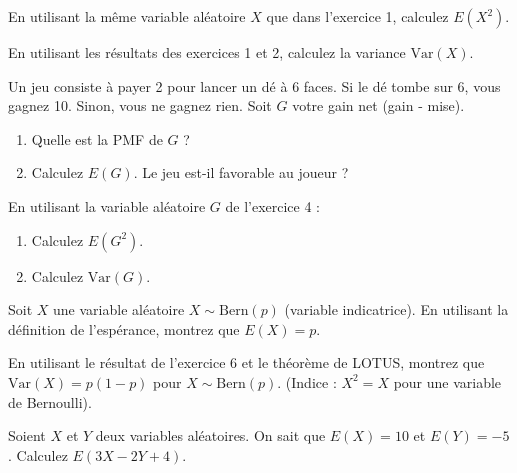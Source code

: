 \begin{exercicebox}
En utilisant la même variable aléatoire $X$ que dans l'exercice 1, calculez $E(X^2)$.
\end{exercicebox}

\begin{exercicebox}
En utilisant les résultats des exercices 1 et 2, calculez la variance $\text{Var}(X)$.
\end{exercicebox}

\begin{exercicebox}
Un jeu consiste à payer 2 pour lancer un dé à 6 faces. Si le dé tombe sur 6, vous gagnez 10. Sinon, vous ne gagnez rien. Soit $G$ votre gain net (gain - mise).
\begin{enumerate}
    \item Quelle est la PMF de $G$ ?
    \item Calculez $E(G)$. Le jeu est-il favorable au joueur ?
\end{enumerate}
\end{exercicebox}

\begin{exercicebox}
En utilisant la variable aléatoire $G$ de l'exercice 4 :
\begin{enumerate}
    \item Calculez $E(G^2)$.
    \item Calculez $\text{Var}(G)$.
\end{enumerate}
\end{exercicebox}

\begin{exercicebox}
Soit $X$ une variable aléatoire $X \sim \text{Bern}(p)$ (variable indicatrice). En utilisant la définition de l'espérance, montrez que $E(X) = p$.
\end{exercicebox}

\begin{exercicebox}
En utilisant le résultat de l'exercice 6 et le théorème de LOTUS, montrez que $\text{Var}(X) = p(1-p)$ pour $X \sim \text{Bern}(p)$. (Indice : $X^2 = X$ pour une variable de Bernoulli).
\end{exercicebox}


\begin{exercicebox}
Soient $X$ et $Y$ deux variables aléatoires. On sait que $E(X) = 10$ et $E(Y) = -5$.
Calculez $E(3X - 2Y + 4)$.
\end{exercicebox}

